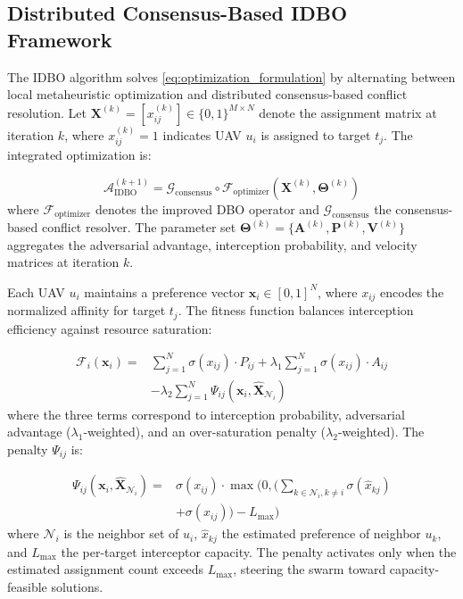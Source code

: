 \documentclass[lettersize,journal]{IEEEtran}
\begin{document}
\subsection{Distributed Consensus-Based IDBO Framework}
\label{subsec:idbo_algorithm}

The IDBO algorithm solves \eqref{eq:optimization_formulation} by alternating between local metaheuristic optimization and distributed consensus-based conflict resolution. Let $\mathbf{X}^{(k)} = [x_{ij}^{(k)}] \in \{0,1\}^{M \times N}$ denote the assignment matrix at iteration $k$, where $x_{ij}^{(k)}=1$ indicates UAV $u_i$ is assigned to target $t_j$. The integrated optimization is:

\begin{equation}
\label{eq:hierarchical}
\mathcal{A}_{\text{IDBO}}^{(k+1)} = \mathcal{G}_{\text{consensus}} \circ \mathcal{F}_{\text{optimizer}} \left( \mathbf{X}^{(k)}, \boldsymbol{\Theta}^{(k)} \right)
\end{equation}
where $\mathcal{F}_{\text{optimizer}}$ denotes the improved DBO operator and $\mathcal{G}_{\text{consensus}}$ the consensus-based conflict resolver. The parameter set $\boldsymbol{\Theta}^{(k)} = \{\mathbf{A}^{(k)}, \mathbf{P}^{(k)}, \mathbf{V}^{(k)}\}$ aggregates the adversarial advantage, interception probability, and velocity matrices at iteration $k$.

Each UAV $u_i$ maintains a preference vector $\mathbf{x}_i \in [0,1]^{N}$, where $x_{ij}$ encodes the normalized affinity for target $t_j$. The fitness function balances interception efficiency against resource saturation:

\begin{equation}
\label{eq:idbo_fitness}
\begin{split}
\mathcal{F}_i(\mathbf{x}_i) =& \sum_{j=1}^{N} \sigma(x_{ij}) \cdot P_{ij} + \lambda_1 \sum_{j=1}^{N} \sigma(x_{ij}) \cdot A_{ij} \\
&- \lambda_2 \sum_{j=1}^{N} \Psi_{ij}(\mathbf{x}_i, \hat{\mathbf{X}}_{\mathcal{N}_i})
\end{split}
\end{equation}
where the three terms correspond to interception probability, adversarial advantage ($\lambda_1$-weighted), and an over-saturation penalty ($\lambda_2$-weighted). The penalty $\Psi_{ij}$ is:

\begin{equation}
\label{eq:saturation_penalty}
\begin{split}
\Psi_{ij}(\mathbf{x}_i, \hat{\mathbf{X}}_{\mathcal{N}_i}) =& \sigma(x_{ij}) \cdot \max\Biggl(0, \Biggl(\sum_{k \in \mathcal{N}_i, k \neq i} \sigma(\hat{x}_{kj}) \\
&+ \sigma(x_{ij})\Biggr) - L_{\max}\Biggr)
\end{split}
\end{equation}
where $\mathcal{N}_i$ is the neighbor set of $u_i$, $\hat{x}_{kj}$ the estimated preference of neighbor $u_k$, and $L_{\max}$ the per-target interceptor capacity. The penalty activates only when the estimated assignment count exceeds $L_{\max}$, steering the swarm toward capacity-feasible solutions.
\end{document}
